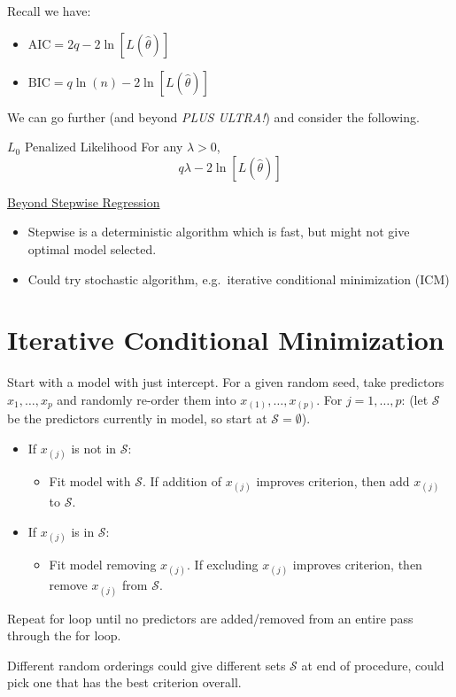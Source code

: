 Recall we have:
\begin{itemize}
      \item $ \text{AIC}=2q-2\ln[L(\hat{\theta})] $
      \item $ \text{BIC}=q\ln(n)-2\ln[L(\hat{\theta})] $
\end{itemize}
We can go further (and beyond \emph{PLUS ULTRA!}) and consider the following.
\begin{Definition}{$ L_0 $ Penalized Likelihood}{}
      For any $ \lambda>0 $,
      \[ q\lambda -2\ln[L(\hat{\theta})] \]
\end{Definition}
\underline{Beyond Stepwise Regression}
\begin{itemize}
      \item Stepwise is a deterministic algorithm which is fast,
            but might not give optimal model selected.
      \item Could try stochastic algorithm, e.g.\ iterative
            conditional minimization (ICM)
\end{itemize}

\section{Iterative Conditional Minimization}
Start with a model with just intercept.
For a given random seed, take predictors $ x_1,\ldots,x_p $
and randomly re-order them into $ x_{(1)},\ldots,x_{(p)} $.
For $ j=1,\ldots,p $: (let $ \mathcal{S} $ be the predictors
currently in model, so start at $ \mathcal{S}=\emptyset $).
\begin{itemize}
      \item If $ x_{(j)} $ is not in $ \mathcal{S} $:
            \begin{itemize}
                  \item Fit model with $ \mathcal{S} $.
                        If addition of $ x_{(j)} $ improves criterion,
                        then add $ x_{(j)} $ to $ \mathcal{S} $.
            \end{itemize}
      \item If $ x_{(j)} $ is in $ \mathcal{S} $:
            \begin{itemize}
                  \item Fit model removing $ x_{(j)} $. If excluding
                        $ x_{(j)} $ improves criterion, then remove
                        $ x_{(j)} $ from $ \mathcal{S} $.
            \end{itemize}
\end{itemize}
Repeat for loop until no predictors are added/removed
from an entire pass through the for loop.
\begin{Remark}{}{}
      Different random orderings could give different
      sets $ \mathcal{S} $ at end of procedure, could pick one
      that has the best criterion overall.
\end{Remark}
